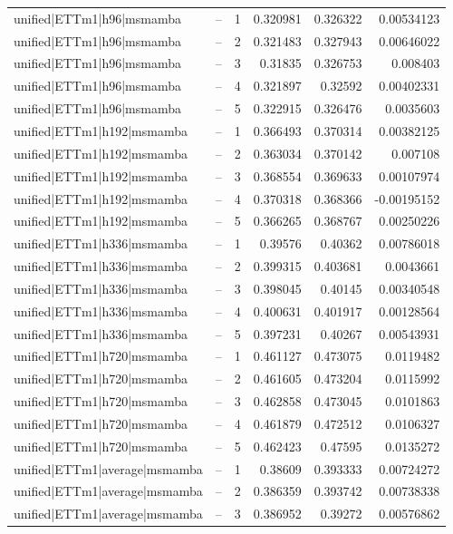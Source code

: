 \begin{longtable}{llrrrr}
unified|ETTm1|h96|msmamba & -- & 1 & 0.320981 & 0.326322 & 0.00534123 \\
unified|ETTm1|h96|msmamba & -- & 2 & 0.321483 & 0.327943 & 0.00646022 \\
unified|ETTm1|h96|msmamba & -- & 3 & 0.31835 & 0.326753 & 0.008403 \\
unified|ETTm1|h96|msmamba & -- & 4 & 0.321897 & 0.32592 & 0.00402331 \\
unified|ETTm1|h96|msmamba & -- & 5 & 0.322915 & 0.326476 & 0.0035603 \\
unified|ETTm1|h192|msmamba & -- & 1 & 0.366493 & 0.370314 & 0.00382125 \\
unified|ETTm1|h192|msmamba & -- & 2 & 0.363034 & 0.370142 & 0.007108 \\
unified|ETTm1|h192|msmamba & -- & 3 & 0.368554 & 0.369633 & 0.00107974 \\
unified|ETTm1|h192|msmamba & -- & 4 & 0.370318 & 0.368366 & -0.00195152 \\
unified|ETTm1|h192|msmamba & -- & 5 & 0.366265 & 0.368767 & 0.00250226 \\
unified|ETTm1|h336|msmamba & -- & 1 & 0.39576 & 0.40362 & 0.00786018 \\
unified|ETTm1|h336|msmamba & -- & 2 & 0.399315 & 0.403681 & 0.0043661 \\
unified|ETTm1|h336|msmamba & -- & 3 & 0.398045 & 0.40145 & 0.00340548 \\
unified|ETTm1|h336|msmamba & -- & 4 & 0.400631 & 0.401917 & 0.00128564 \\
unified|ETTm1|h336|msmamba & -- & 5 & 0.397231 & 0.40267 & 0.00543931 \\
unified|ETTm1|h720|msmamba & -- & 1 & 0.461127 & 0.473075 & 0.0119482 \\
unified|ETTm1|h720|msmamba & -- & 2 & 0.461605 & 0.473204 & 0.0115992 \\
unified|ETTm1|h720|msmamba & -- & 3 & 0.462858 & 0.473045 & 0.0101863 \\
unified|ETTm1|h720|msmamba & -- & 4 & 0.461879 & 0.472512 & 0.0106327 \\
unified|ETTm1|h720|msmamba & -- & 5 & 0.462423 & 0.47595 & 0.0135272 \\
unified|ETTm1|average|msmamba & -- & 1 & 0.38609 & 0.393333 & 0.00724272 \\
unified|ETTm1|average|msmamba & -- & 2 & 0.386359 & 0.393742 & 0.00738338 \\
unified|ETTm1|average|msmamba & -- & 3 & 0.386952 & 0.39272 & 0.00576862 \\

\end{longtable}
